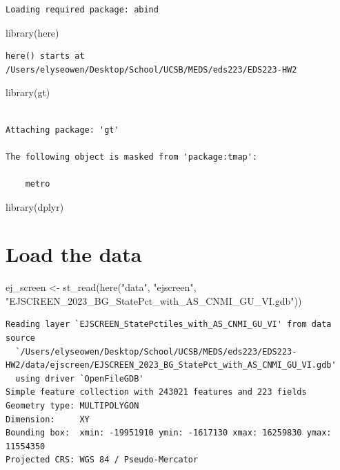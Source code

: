 \documentclass[
  letterpaper,
  DIV=11,
  numbers=noendperiod]{scrartcl}
\newenvironment{Shaded}{\begin{snugshade}}{\end{snugshade}}
\newcommand{\FunctionTok}[1]{\textcolor[rgb]{0.28,0.35,0.67}{#1}}
\newcommand{\NormalTok}[1]{\textcolor[rgb]{0.00,0.23,0.31}{#1}}
\newcommand{\OtherTok}[1]{\textcolor[rgb]{0.00,0.23,0.31}{#1}}
\newcommand{\StringTok}[1]{\textcolor[rgb]{0.13,0.47,0.30}{#1}}
\begin{document}
\begin{verbatim}
Loading required package: abind
\end{verbatim}

\begin{Shaded}
\begin{Highlighting}[]
\FunctionTok{library}\NormalTok{(here)}
\end{Highlighting}
\end{Shaded}

\begin{verbatim}
here() starts at /Users/elyseowen/Desktop/School/UCSB/MEDS/eds223/EDS223-HW2
\end{verbatim}

\begin{Shaded}
\begin{Highlighting}[]
\FunctionTok{library}\NormalTok{(gt)}
\end{Highlighting}
\end{Shaded}

\begin{verbatim}

Attaching package: 'gt'

The following object is masked from 'package:tmap':

    metro
\end{verbatim}

\begin{Shaded}
\begin{Highlighting}[]
\FunctionTok{library}\NormalTok{(dplyr)}
\end{Highlighting}
\end{Shaded}

\section{Load the data}\label{load-the-data}

\begin{Shaded}
\begin{Highlighting}[]
\NormalTok{ej\_screen }\OtherTok{\textless{}{-}} \FunctionTok{st\_read}\NormalTok{(}\FunctionTok{here}\NormalTok{(}\StringTok{"data"}\NormalTok{, }\StringTok{"ejscreen"}\NormalTok{, }\StringTok{"EJSCREEN\_2023\_BG\_StatePct\_with\_AS\_CNMI\_GU\_VI.gdb"}\NormalTok{))}
\end{Highlighting}
\end{Shaded}

\begin{verbatim}
Reading layer `EJSCREEN_StatePctiles_with_AS_CNMI_GU_VI' from data source 
  `/Users/elyseowen/Desktop/School/UCSB/MEDS/eds223/EDS223-HW2/data/ejscreen/EJSCREEN_2023_BG_StatePct_with_AS_CNMI_GU_VI.gdb' 
  using driver `OpenFileGDB'
Simple feature collection with 243021 features and 223 fields
Geometry type: MULTIPOLYGON
Dimension:     XY
Bounding box:  xmin: -19951910 ymin: -1617130 xmax: 16259830 ymax: 11554350
Projected CRS: WGS 84 / Pseudo-Mercator
\end{verbatim}
\end{document}
